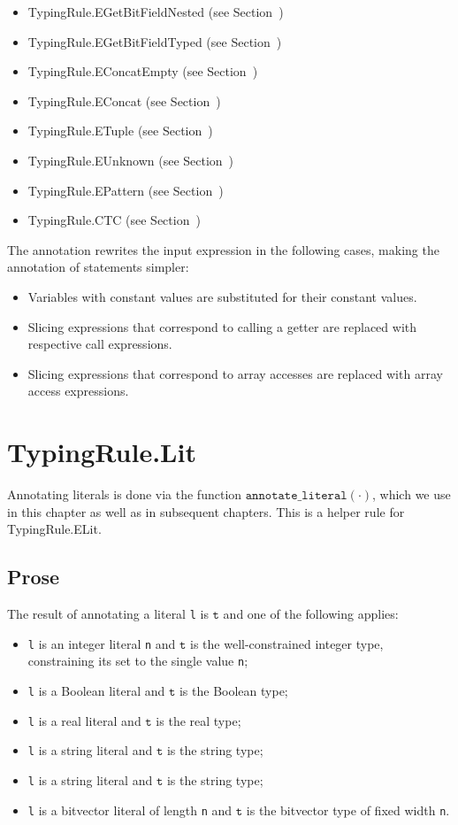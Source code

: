 \documentclass{book}
\newcommand\annotateliteral[1]{\texttt{annotate\_literal}(#1)}
\newcommand\vt[0]{\texttt{t}}
\begin{document}
\begin{itemize}
\begin{itemize}
\item TypingRule.EGetBitFieldNested (see Section~)
\item TypingRule.EGetBitFieldTyped (see Section~)
\item TypingRule.EConcatEmpty (see Section~)
\item TypingRule.EConcat (see Section~)
\item TypingRule.ETuple (see Section~)
\item TypingRule.EUnknown (see Section~)
\item TypingRule.EPattern (see Section~)
\item TypingRule.CTC (see Section~)
\end{itemize}

The annotation rewrites the input expression in the following cases, making the annotation of statements simpler:
\begin{itemize}
  \item Variables with constant values are substituted for their constant values.
  \item Slicing expressions that correspond to calling a getter are replaced with respective call expressions.
  \item Slicing expressions that correspond to array accesses are replaced with array access expressions.
\end{itemize}

\section{TypingRule.Lit \label{sec:TypingRule.Lit}}

Annotating literals is done via the function $\annotateliteral{\cdot}$,
which we use in this chapter as well as in subsequent chapters.
This is a helper rule for TypingRule.ELit.
\subsection{Prose}
The result of annotating a literal \texttt{l} is $\vt$ and one of the following applies:
\begin{itemize}
\item \texttt{l} is an integer literal \texttt{n} and $\vt$ is the well-constrained integer type, constraining
its set to the single value \texttt{n};
\item \texttt{l} is a Boolean literal and $\vt$ is the Boolean type;
\item \texttt{l} is a real literal and $\vt$ is the real type;
\item \texttt{l} is a string literal and $\vt$ is the string type;
\item \texttt{l} is a string literal and $\vt$ is the string type;
\item \texttt{l} is a bitvector literal of length \texttt{n} and $\vt$ is the bitvector type of fixed width \texttt{n}.
\end{itemize}


\end{itemize}
\end{document}

